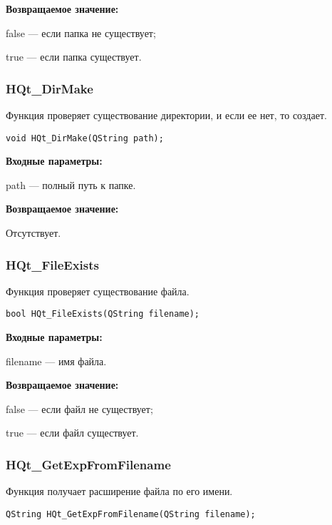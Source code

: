 \documentclass[a4paper,12pt]{article}
\begin{document}
\textbf{Возвращаемое значение:}

false --- если папка не существует;

true --- если папка существует.


\subsubsection{HQt\_DirMake}\label{HQt_DirMake}

Функция проверяет существование директории, и если ее нет, то создает.


\begin{lstlisting}[label=code_syntax_HQt_DirMake,caption=Синтаксис]
void HQt_DirMake(QString path);
\end{lstlisting}

\textbf{Входные параметры:}

path --- полный путь к папке.

\textbf{Возвращаемое значение:}

Отсутствует.


\subsubsection{HQt\_FileExists}\label{HQt_FileExists}

Функция проверяет существование файла.


\begin{lstlisting}[label=code_syntax_HQt_FileExists,caption=Синтаксис]
bool HQt_FileExists(QString filename);
\end{lstlisting}

\textbf{Входные параметры:}

filename --- имя файла.

\textbf{Возвращаемое значение:}

false --- если файл не существует;

true --- если файл существует.


\subsubsection{HQt\_GetExpFromFilename}\label{HQt_GetExpFromFilename}

Функция получает расширение файла по его имени.


\begin{lstlisting}[label=code_syntax_HQt_GetExpFromFilename,caption=Синтаксис]
QString HQt_GetExpFromFilename(QString filename);
\end{lstlisting}
\end{document}
